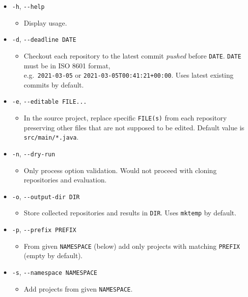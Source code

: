 \begin{itemize}
\item
  \texttt{-h}, \texttt{-\/-help}

  \begin{itemize}
  \item
    Display usage.
  \end{itemize}
\item
  \texttt{-d}, \texttt{-\/-deadline\ DATE}

  \begin{itemize}
  \item
    Checkout each repository to the latest commit \emph{pushed} before \texttt{DATE}. \texttt{DATE} must be in ISO 8601 format,  \\e.g.~\texttt{2021-03-05} or \texttt{2021-03-05T00:41:21+00:00}. Uses latest existing commits by default.
  \end{itemize}
\item
  \texttt{-e}, \texttt{-\/-editable\ FILE...}

  \begin{itemize}
  \item
    In the source project, replace specific \texttt{FILE(s)} from each repository preserving other files that are not supposed to be edited. Default value is \texttt{src/main/*.java}.
  \end{itemize}
\item
  \texttt{-n}, \texttt{-\/-dry-run}

  \begin{itemize}
  \item
    Only process option validation. Would not proceed with cloning repositories and evaluation.
  \end{itemize}
\item
  \texttt{-o}, \texttt{-\/-output-dir\ DIR}

  \begin{itemize}
  \item
    Store collected repositories and results in \texttt{DIR}. Uses \texttt{mktemp} by default.
  \end{itemize}
\item
  \texttt{-p}, \texttt{-\/-prefix\ PREFIX}

  \begin{itemize}
  \item
    From given \texttt{NAMESPACE} (below) add only projects with matching \texttt{PREFIX} (empty by default).
  \end{itemize}
\item
  \texttt{-s}, \texttt{-\/-namespace\ NAMESPACE}

  \begin{itemize}
  \item
    Add projects from given \texttt{NAMESPACE}.
  \end{itemize}
\end{itemize}

